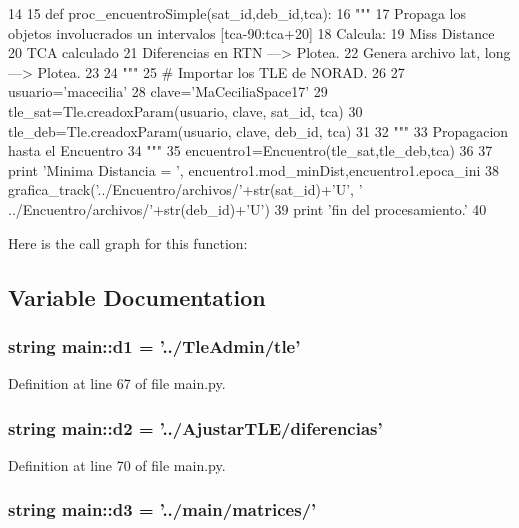 \begin{DoxyCode}
14 
15 def proc_encuentroSimple(sat_id,deb_id,tca):
16     """
17     Propaga los objetos involucrados un intervalos [tca-90:tca+20]
18     Calcula:
19         Miss Distance
20         TCA calculado
21         Diferencias en RTN ---> Plotea.
22         Genera archivo lat, long ---> Plotea.
23       
24     """
25     # Importar los TLE de NORAD.
26 
27     usuario='macecilia'
28     clave='MaCeciliaSpace17'
29     tle_sat=Tle.creadoxParam(usuario, clave, sat_id, tca)
30     tle_deb=Tle.creadoxParam(usuario, clave, deb_id, tca)
31     
32     """
33     Propagacion hasta el Encuentro
34     """
35     encuentro1=Encuentro(tle_sat,tle_deb,tca)
36 
37     print 'Minima Distancia = ', encuentro1.mod_minDist,encuentro1.epoca_ini
38     grafica_track('../Encuentro/archivos/'+str(sat_id)+'U', '
      ../Encuentro/archivos/'+str(deb_id)+'U')
39     print 'fin del procesamiento.'
40 
    
\end{DoxyCode}


\-Here is the call graph for this function\-:




\subsection{\-Variable \-Documentation}
\subsubsection[{d1}]{\setlength{\rightskip}{0pt plus 5cm}string {\bf main\-::d1} = '../\-Tle\-Admin/tle'}\label{namespacemain_af589f10551d2ceaba530da9678b5199b}


\-Definition at line 67 of file main.\-py.

\subsubsection[{d2}]{\setlength{\rightskip}{0pt plus 5cm}string {\bf main\-::d2} = '../\-Ajustar\-T\-L\-E/diferencias'}\label{namespacemain_a0fe8679407d5e2fcc95a91ba59171afa}


\-Definition at line 70 of file main.\-py.

\subsubsection[{d3}]{\setlength{\rightskip}{0pt plus 5cm}string {\bf main\-::d3} = '../main/matrices/'}\label{namespacemain_a5acea98c221a36122a1bffd8ea3650dd}


